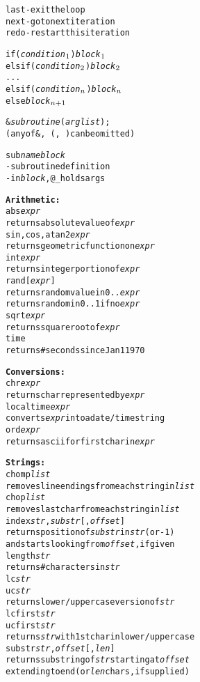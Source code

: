 \documentclass[twocolumn,12pt]{article}
\begin{document}
\begin{alltt}
last - \textrm{exit the loop}
next - \textrm{go to next iteration}
redo - \textrm{restart this iteration}

if (\emph{condition\(\sb{1}\)}) \emph{block\(\sb{1}\)}
elsif (\emph{condition\(\sb{2}\)}) \emph{block\(\sb{2}\)}
...
elsif (\emph{condition\(\sb{n}\)}) \emph{block\(\sb{n}\)}
else \emph{block\(\sb{n+1}\)}

&\emph{subroutine}(\emph{arglist});
   \textrm{\small(any of }\verb|&, (, )|\textrm{\small can be omitted)}

sub \emph{name} \emph{block}
   - \textrm{subroutine definition}
   - \textrm{in \emph{block},} \verb|@_| \textrm{holds args}


\textrm{\large\bf{Arithmetic:}}
abs \emph{expr}
   \textrm{returns absolute value of} \emph{expr}
sin, cos, atan2 \emph{expr}
   \textrm{returns geometric function on} \emph{expr}
int \emph{expr}
   \textrm{returns integer portion of} \emph{expr}
rand [ \emph{expr} ]
   \textrm{returns random value in 0..}\emph{expr}
   \textrm{returns random in 0..1 if no} \emph{expr}
sqrt \emph{expr}
   \textrm{returns square root of} \emph{expr}
time
   \textrm{returns \# seconds since Jan 1 1970}

\textrm{\large\bf{Conversions:}}
chr \emph{expr}
   \textrm{returns char represented by} \emph{expr}
localtime \emph{expr}
   \textrm{converts} \emph{expr} \textrm{into a date/time string}
ord \emph{expr}
   \textrm{returns ascii for first char in} \emph{expr}

\textrm{\large\bf{Strings:}}
chomp \emph{list}
   \textrm{removes line endings from each string in} \emph{list}
chop \emph{list}
   \textrm{removes last char from each string in} \emph{list}
index \emph{str},\emph{substr}[,\emph{offset}]
   \textrm{returns position of \emph{substr} in \emph{str} (or -1)}
   \textrm{and starts looking from \emph{offset}, if given}
length \emph{str}
   \textrm{returns \# characters in} \emph{str}
lc \emph{str}
uc \emph{str}
   \textrm{returns lower/upper case version of} \emph{str}
lcfirst \emph{str}
ucfirst \emph{str}
   \textrm{returns} \emph{str} \textrm{with 1st char in lower/upper case}
substr \emph{str},\emph{offset}[,\emph{len}]
   \textrm{returns substring of} \emph{str} \textrm{starting at} \emph{offset}
   \textrm{extending to end (or} \emph{len} \textrm{chars, if supplied)}


\end{alltt}
\end{document}

